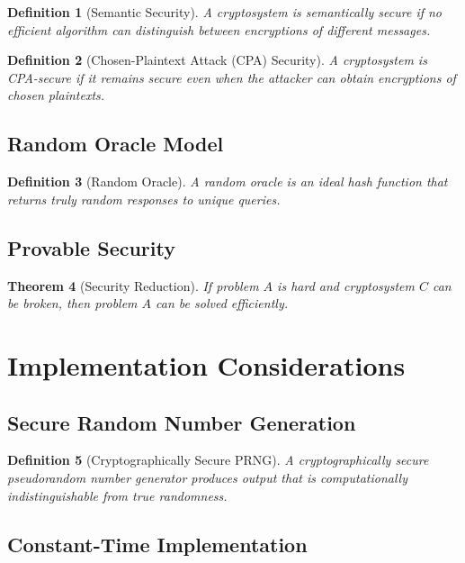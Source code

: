 \documentclass[11pt,a4paper]{article}
\newtheorem{theorem}{Theorem}[section]
\newtheorem{definition}[theorem]{Definition}
\begin{document}
\begin{definition}[Semantic Security]
A cryptosystem is semantically secure if no efficient algorithm can distinguish between encryptions of different messages.
\end{definition}

\begin{definition}[Chosen-Plaintext Attack (CPA) Security]
A cryptosystem is CPA-secure if it remains secure even when the attacker can obtain encryptions of chosen plaintexts.
\end{definition}

\subsection{Random Oracle Model}

\begin{definition}[Random Oracle]
A random oracle is an ideal hash function that returns truly random responses to unique queries.
\end{definition}

\subsection{Provable Security}

\begin{theorem}[Security Reduction]
If problem $A$ is hard and cryptosystem $C$ can be broken, then problem $A$ can be solved efficiently.
\end{theorem}

\section{Implementation Considerations}

\subsection{Secure Random Number Generation}

\begin{definition}[Cryptographically Secure PRNG]
A cryptographically secure pseudorandom number generator produces output that is computationally indistinguishable from true randomness.
\end{definition}

\subsection{Constant-Time Implementation}
\end{document}
